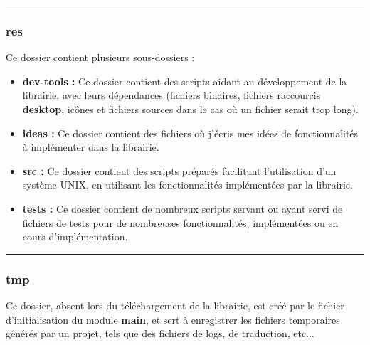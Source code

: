 \documentclass[a4paper,10pt]{article}
\begin{document}

\color{blue}\par\noindent\rule{\textwidth}{0.4pt}\color{white}

\color{blue}
\subsubsection{res}\color{white}

\begin{justify}
    Ce dossier contient plusieurs sous-dossiers :

    \begin{itemize}
        \item \textbf{\color{lime}dev-tools\color{white} :} Ce dossier contient des scripts aidant au développement de la librairie, avec leurs dépendances (fichiers binaires, fichiers raccourcis \textbf{desktop}, icônes et fichiers sources dans le cas où un fichier serait trop long).\\

        \item \textbf{\color{lime}ideas\color{white} :} Ce dossier contient des fichiers où j'écris mes idées de fonctionnalités à implémenter dans la librairie.\\

        \item \textbf{\color{lime}src\color{white} :} Ce dossier contient des scripts préparés facilitant l'utilisation d'un système UNIX, en utilisant les fonctionnalités implémentées par la librairie.\\

        \item \textbf{\color{lime}tests\color{white} :} Ce dossier contient de nombreux scripts servant ou ayant servi de fichiers de tests pour de nombreuses fonctionnalités, implémentées ou en cours d'implémentation.
    \end{itemize}
\end{justify}



\color{blue}\par\noindent\rule{\textwidth}{0.4pt}\color{white}

\color{blue}
\subsubsection{tmp}\color{white}

\begin{justify}
    Ce dossier, absent lors du téléchargement de la librairie, est créé par le fichier d'initialisation du module \textbf{main}, et sert à enregistrer les fichiers temporaires générés par un projet, tels que des fichiers de logs, de traduction, etc...
\end{justify}
\end{document}
